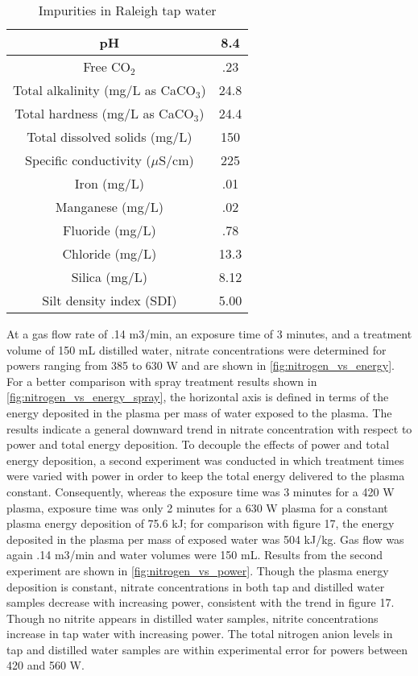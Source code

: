 \begin{table}[htpb]
  \begin{center}
    \begin{tabular}{|c |c |}
      \hline
      pH & 8.4 \\\hline
      Free CO$_2$ & .23 \\\hline
      Total alkalinity (mg/L as CaCO$_3$) & 24.8 \\\hline
      Total hardness (mg/L as CaCO$_3$) & 24.4 \\\hline
      Total dissolved solids (mg/L) & 150 \\\hline
      Specific conductivity ($\mu$S/cm) & 225 \\\hline
      Iron (mg/L) & .01 \\\hline
      Manganese (mg/L) & .02 \\\hline
      Fluoride (mg/L) & .78 \\\hline
      Chloride (mg/L) & 13.3 \\\hline
      Silica (mg/L) & 8.12 \\\hline
      Silt density index (SDI) & 5.00 \\
      \hline
    \end{tabular}
  \end{center}
  \caption{Impurities in Raleigh tap water}
  \label{tab:tap_water}
\end{table}

At a gas flow rate of .14 m3/min, an exposure time of 3 minutes, and a treatment volume of 150 mL distilled water, nitrate concentrations were determined for powers ranging from 385 to 630 W and are shown in \cref{fig:nitrogen_vs_energy}.  For a better comparison with spray treatment results shown in \cref{fig:nitrogen_vs_energy_spray}, the horizontal axis is defined in terms of the energy deposited in the plasma per mass of water exposed to the plasma.  The results indicate a general downward trend in nitrate concentration with respect to power and total energy deposition.   To decouple the effects of power and total energy deposition, a second experiment was conducted in which treatment times were varied with power in order to keep the total energy delivered to the plasma constant.  Consequently, whereas the exposure time was 3 minutes for a 420 W plasma, exposure time was only 2 minutes for a 630 W plasma for a constant plasma energy deposition of 75.6 kJ; for comparison with figure 17, the energy deposited in the plasma per mass of exposed water was 504 kJ/kg.  Gas flow was again .14 m3/min and water volumes were 150 mL.  Results from the second experiment are shown in \cref{fig:nitrogen_vs_power}.  Though the plasma energy deposition is constant, nitrate concentrations in both tap and distilled water samples decrease with increasing power, consistent with the trend in figure 17.  Though no nitrite appears in distilled water samples, nitrite concentrations increase in tap water with increasing power.  The total nitrogen anion levels in tap and distilled water samples are within experimental error for powers between 420 and 560 W.


